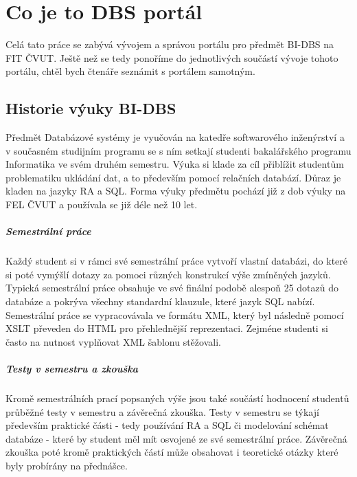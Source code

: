 \chapter{Co je to DBS portál} \label{DBSportal}

Celá tato práce se zabývá vývojem a správou portálu pro předmět BI-DBS na FIT ČVUT. Ještě než se tedy ponoříme do jednotlivých součástí vývoje tohoto portálu, chtěl bych čtenáře seznámit s portálem samotným.

\section{Historie výuky BI-DBS}

Předmět Databázové systémy je vyučován na katedře softwarového inženýrství a v současném studijním programu se s ním setkají studenti bakalářského programu Informatika ve svém druhém semestru. Výuka si klade za cíl přiblížit studentům problematiku ukládání dat, a to především pomocí relačních databází. Důraz je kladen na jazyky RA a SQL. Forma výuky předmětu pochází již z dob výuky na FEL ČVUT a používala se již déle než 10 let.

\paragraph{Semestrální práce}
Každý student si v rámci své semestrální práce vytvoří vlastní databázi, do které si poté vymýšlí dotazy za pomoci různých konstrukcí výše zmíněných jazyků. Typická semestrální práce obsahuje ve své finální podobě alespoň 25 dotazů do databáze a pokrýva všechny standardní klauzule, které jazyk SQL nabízí. Semestrální práce se vypracovávala ve formátu XML, který byl následně pomocí XSLT převeden do HTML pro přehlednější reprezentaci. Zejméne studenti si často na nutnost vyplňovat XML šablonu stěžovali.

\paragraph{Testy v semestru a zkouška}
Kromě semestrálních prací popsaných výše jsou také součástí hodnocení studentů průběžné testy v semestru a závěrečná zkouška. Testy v semestru se týkají především praktické části - tedy používání RA a SQL či modelování schémat databáze - které by student měl mít osvojené ze své semestrální práce. Závěrečná zkouška poté kromě praktických částí může obsahovat i teoretické otázky které byly probírány na přednášce.

